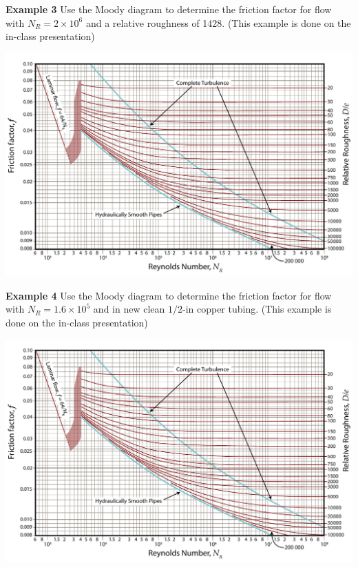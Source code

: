 \documentclass[10pt, onesided]{amsart}
\begin{document}
	\newpage
	
	
	\raggedright
	\textbf{Example 3}
	Use the Moody diagram to determine the friction factor for flow with $N_R=2\times 10^6$ and a relative roughness of
	1428.
	\parb
	(This example is done on the in-class presentation)
	\begin{center}
		\includegraphics[scale=1.05, angle=90]{../../figs/05FrictionLosses/moody.pdf}
	\end{center}
	
	
	\newpage
	
	
	\textbf{Example 4}
	Use the Moody diagram to determine the friction factor for flow with $N_R=1.6\times 10^5$ and in new clean
	$1/2$-in copper tubing.
	\parb
	(This example is done on the in-class presentation)
	
	\begin{center}
		\includegraphics[scale=1.05, angle=90]{../../figs/05FrictionLosses/moody.pdf}
	\end{center}
	
\end{document}
